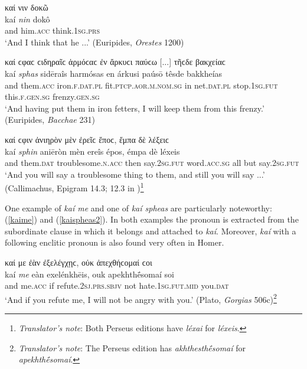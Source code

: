 \begin{exe}
\ex καί νιν δοκῶ\\
\gll kaí \emph{nin} dokô\\
and him.\textsc{acc} think.\textsc{1sg.prs}\\
\trans `And I think that he ...' (Euripides, \textit{Orestes} 1200)
\label{kainin}
\end{exe}

\begin{exe}
\ex καί ϲφαϲ ϲιδηραῖϲ ἁρμόϲαϲ ἐν ἄρκυϲι παύϲω {[}...{]} τῆϲδε βακχείαϲ\\
\gll kaí \emph{sphas} sidēraîs harmósas en árkusi paúsō têsde bakkheías\\
and them.\textsc{acc} iron.\textsc{f.dat.pl} fit.\textsc{ptcp.aor.m.nom.sg} in net.\textsc{dat.pl} stop.\textsc{1sg.fut} this.\textsc{f.gen.sg} frenzy.\textsc{gen.sg}\\
\trans `And having put them in iron fetters, I will keep them from this frenzy.' (Euripides, \textit{Bacchae} 231)
\label{kaisphas}
\end{exe}

\begin{exe}
\ex καί ϲφιν ἀνιηρὸν μὲν ἐρεῖϲ ἔποϲ, ἔμπα δὲ λέξειϲ\\
\gll kaí \emph{sphin} aniēròn mèn ereîs épos, émpa dè léxeis\\
and them.\textsc{dat} troublesome.\textsc{n.acc} then say.\textsc{2sg.fut} word.\textsc{acc.sg} all but say.\textsc{2sg.fut}\\
\trans `And you will say a troublesome thing to them, and still you will say ...' (Callimachus, Epigram 14.3; 12.3 in \citealp{Wilamowitz1882})\footnote{\emph{Translator's note}: Both Perseus editions have \textit{léxai} for \textit{léxeis}.}
\label{kaisphin4}
\end{exe}

One example of \textit{kaí me} and one of \textit{kaí spheas} are particularly noteworthy: (\ref{kaime}) and (\ref{kaispheas2}). In both examples the pronoun is extracted from the subordinate clause in which it belongs and attached to \textit{kaí}. Moreover, \textit{kaí} with a following enclitic pronoun is also found very often in Homer.

\largerpage[2]
\begin{exe}
\ex καί με ἐὰν ἐξελέγχῃϲ, οὐκ ἀπεχθήϲομαί ϲοι\\
\gll kaí \emph{me} eàn exelénkhēis, ouk apekhthḗsomaí soi\\
and me.\textsc{acc} if refute.\textsc{2sj.prs.sbjv} not hate.\textsc{1sg.fut.mid} you.\textsc{dat}\\
\trans `And if you refute me, I will not be angry with you.' (Plato, \textit{Gorgias} 506c)\footnote{\emph{Translator's note}: The Perseus edition has \textit{akhthesthḗsomaí} for \textit{apekhthḗsomaí}.}
\label{kaime}
\end{exe}

